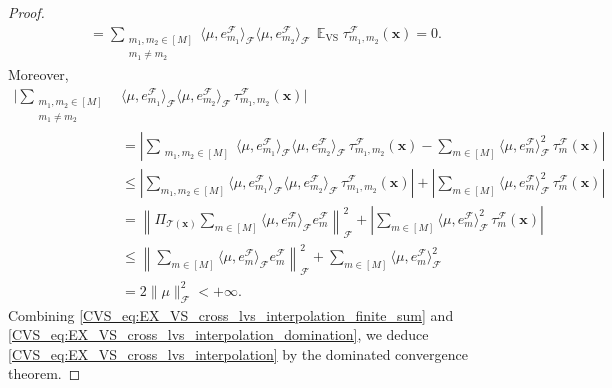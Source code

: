 \documentclass[twoside,11pt]{book}
\numberwithin{theorem}{chapter}
\numberwithin{definition}{chapter}
\numberwithin{proposition}{chapter}
\numberwithin{corollary}{chapter}
\numberwithin{example}{chapter}
\numberwithin{lemma}{chapter}
\numberwithin{assumption}{chapter}
\DeclareMathOperator{\VS}{\mathrm{VS}}
\DeclareMathOperator{\EX}{\mathbb{E}}
\DeclareMathOperator{\F}{\mathcal{F}}
\begin{document}
\begin{proof}
\begin{align}
& =  \sum\limits_{\substack{m_{1},m_{2} \in [M] \\ m_{1} \neq m_{2}}}  \langle \mu, e_{m_{1}}^{\F} \rangle_{\F} \langle \mu, e_{m_{2}}^{\F} \rangle_{\F} \,\EX_{\VS} \tau_{m_{1},m_{2}}^{\F}(\bm{x}) = 0.
\label{CVS_eq:EX_VS_cross_lvs_interpolation_finite_sum}
\end{align}
Moreover,
\begin{align}
\Bigg\vert\sum\limits_{\substack{m_{1},m_{2} \in [M] \\ m_{1} \neq m_{2}}}  &\langle \mu, e_{m_{1}}^{\F} \rangle_{\F} \langle \mu, e_{m_{2}}^{\F} \rangle_{\F} \,\tau_{m_{1},m_{2}}^{\F}(\bm{x})\Bigg\vert\nonumber \\
& = \left|\sum\limits_{\substack{m_{1},m_{2} \in [M]}}  \langle \mu, e_{m_{1}}^{\F} \rangle_{\F} \langle \mu, e_{m_{2}}^{\F} \rangle_{\F} \,\tau_{m_{1},m_{2}}^{\F}(\bm{x}) - \sum\limits_{m \in [M]} \langle \mu, e_{m}^{\F} \rangle_{\F}^{2} \,\tau_{m}^{\F}(\bm{x})\right|  \nonumber\\
 & \leq \left|\sum\limits_{m_{1},m_{2} \in [M]}  \langle \mu, e_{m_{1}}^{\F} \rangle_{\F} \langle \mu, e_{m_{2}}^{\F} \rangle_{\F} \,\tau_{m_{1},m_{2}}^{\F}(\bm{x})\right|
 +  \left|\sum\limits_{m \in [M]} \langle \mu, e_{m}^{\F} \rangle_{\F}^{2} \,\tau_{m}^{\F}(\bm{x})\right| \nonumber\\
& = \left\| \Pi_{\mathcal{T}(\bm{x})} \sum\limits_{m \in [M]} \langle \mu, e_{m}^{\F} \rangle_{\F} e_{m}^{\F}\right\|_{\F}^{2}  +  \left|\sum\limits_{m \in [M]} \langle \mu, e_{m}^{\F} \rangle_{\F}^{2} \,\tau_{m}^{\F}(\bm{x})\right| \nonumber\\
& \leq \left\|\sum\limits_{m \in [M]} \langle \mu, e_{m}^{\F} \rangle_{\F} e_{m}^{\F}\right\|_{\F}^{2}  +  \sum\limits_{m \in [M]} \langle \mu, e_{m}^{\F} \rangle_{\F}^{2} \nonumber \\
& = 2 \|\mu\|_{\F}^{2} < +\infty.
\label{CVS_eq:EX_VS_cross_lvs_interpolation_domination}
\end{align}
Combining \eqref{CVS_eq:EX_VS_cross_lvs_interpolation_finite_sum} and \eqref{CVS_eq:EX_VS_cross_lvs_interpolation_domination}, we deduce \eqref{CVS_eq:EX_VS_cross_lvs_interpolation} by the dominated convergence theorem.


\end{proof}
\end{document}
